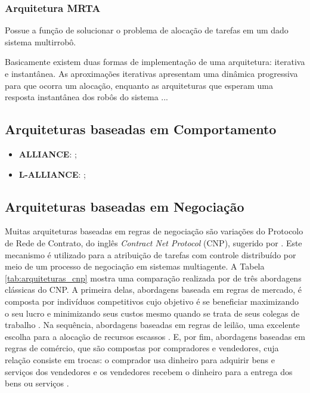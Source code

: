         \subsubsection{Arquitetura MRTA} \label{subsec:arquiteturas_mrta}
            Possue a função de solucionar o problema de alocação de tarefas em um dado sistema multirrobô.
            
            Basicamente existem duas formas de implementação de uma arquitetura: iterativa e instantânea. As aproximações iterativas apresentam uma dinâmica progressiva para que ocorra um alocação, enquanto as arquiteturas que esperam uma resposta instantânea dos robôs do sistema ...
        
            \subsection{Arquiteturas baseadas em Comportamento} \label{subsec:arch_comportamento}
            
                \begin{itemize}
                    \item \textbf{ALLIANCE}: \cite{ref:parker1998alliance};
                    \item \textbf{L-ALLIANCE}: \cite{ref:parker1996lalliance};
                    
                \end{itemize}
            
            \subsection{Arquiteturas baseadas em Negociação} \label{subsec:arch_mercado}
                Muitas arquiteturas baseadas em regras de negociação são variações do Protocolo de Rede de Contrato, do inglês \textit{Contract Net Protocol} (CNP), sugerido por . Este mecanismo é utilizado para a atribuição de tarefas com controle distribuído por meio de um processo de negociação em sistemas multiagente. A Tabela \ref{tab:arquiteturas_cnp} mostra uma comparação realizada por  de três abordagens clássicas do CNP. A primeira delas, abordagens baseada em regras de mercado, é composta por indivíduos competitivos cujo objetivo é se beneficiar maximizando o seu lucro e minimizando seus custos mesmo quando se trata de seus colegas de trabalho \cite{ref:zlot2006auction}.
                Na sequência, abordagens baseadas em regras de leilão, uma excelente escolha para a alocação de recursos escassos \cite{ref:gerkey2002murdoch}. E, por fim, abordagens baseadas em regras de comércio, que são compostas por compradores e vendedores, cuja relação consiste em trocas: o comprador usa dinheiro para adquirir bens e serviços dos vendedores e os vendedores recebem o dinheiro para a entrega dos bens ou serviços \cite{ref:yan2011trade}.
                
